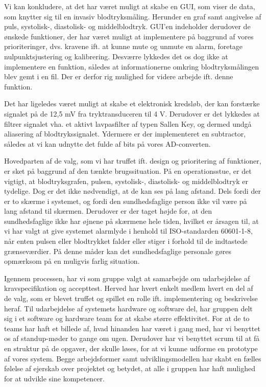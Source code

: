 Vi kan konkludere, at det har været muligt at skabe en GUI, som viser de data, som knytter sig til en invasiv blodtryksmåling. Herunder en graf samt angivelse af puls, systolisk-, diastolisk- og middelblodtryk. GUI’en indeholder derudover de ønskede funktioner, der har været muligt at implementere på baggrund af vores prioriteringer, dvs. kravene ift. at kunne mute og unmute en alarm, foretage nulpunktsjustering og kalibrering.
Desværre lykkedes det os dog ikke at implementere en funktion, således at informationerne omkring blodtryksmålingen blev gemt i en fil. Der er derfor rig mulighed for videre arbejde ift. denne funktion. 

Det har ligeledes været muligt at skabe et elektronisk kredsløb, der kan forstærke signalet på de 12,5 mV fra tryktransduceren til 4 V. Derudover er det lykkedes at filtrer signalet vha. et aktivt lavpasfilter af typen Sallen Key, og dermed undgå aliasering af blodtrykssignalet. Ydermere er der implementeret en subtractor, således at vi kan udnytte det fulde af bits på vores AD-converten. 

Hovedparten af de valg, som vi har truffet ift. design og prioritering af funktioner, er sket på baggrund af den tænkte brugssituation. På en operationsstue, er det vigtigt, at blodtryksgrafen, pulsen, systolisk-, diastolisk- og middelblodtryk er tydelige. Dog er det ikke nødvendigt, at de kan ses på lang afstand. Dels fordi der er to skærme i systemet, og fordi den sundhedsfaglige person ikke vil være på lang afstand til skærmen. Derudover er der taget højde for, at den sundhedsfaglige ikke har øjnene på skærmene hele tiden, hvilket er årsagen til, at vi har valgt at give systemet alarmlyde i henhold til ISO-standarden 60601-1-8, når enten pulsen eller blodtrykket falder eller stiger i forhold til de indtastede grænseværdier. På denne måder kan det sundhedsfaglige personale gøres opmærksom på en muligvis farlig situation. 

Igennem processen, har vi som gruppe valgt at samarbejde om udarbejdelse af kravspecifikation og accepttest. Herved har hvert enkelt medlem hvert en del af de valg, som er blevet truffet og spillet en rolle ift. implementering og beskrivelse heraf. Til udarbejdelse af systemets hardware og software del, har gruppen delt sig i et software og hardware team for at skabe større effektivitet. For at de to teams har haft et billede af, hvad hinanden har været i gang med, har vi benyttet os af standup-møder to gange om ugen. Derudover har vi benyttet scrum til at få en struktur på de opgaver, der skulle løses, for at vi kunne udforme en prototype af vores system. Begge arbejdsformer samt udviklingsmodellen har skabt en fælles følelse af ejerskab over projektet og betydet, at alle i gruppen har haft mulighed for at udvikle sine kompetencer.
